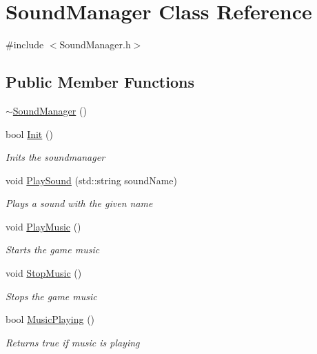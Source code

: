 \hypertarget{class_sound_manager}{}\section{Sound\+Manager Class Reference}
\label{class_sound_manager}


{\ttfamily \#include $<$Sound\+Manager.\+h$>$}

\subsection*{Public Member Functions}
\begin{DoxyCompactItemize}
\item 
\mbox{\hyperlink{class_sound_manager_ad5dbf8eab22db48ff8f3db51b02f8938}{$\sim$\+Sound\+Manager}} ()
\item 
bool \mbox{\hyperlink{class_sound_manager_af1ee5e29fca894a8ac9aeeb56b81f21d}{Init}} ()
\begin{DoxyCompactList}\small\item\em Inits the soundmanager \end{DoxyCompactList}\item 
void \mbox{\hyperlink{class_sound_manager_af84f2acbde4d8c0d8f5b47c2d917e486}{Play\+Sound}} (std\+::string sound\+Name)
\begin{DoxyCompactList}\small\item\em Plays a sound with the given name \end{DoxyCompactList}\item 
void \mbox{\hyperlink{class_sound_manager_ab4f6bc3b9c203232424b10da9912cf1b}{Play\+Music}} ()
\begin{DoxyCompactList}\small\item\em Starts the game music \end{DoxyCompactList}\item 
void \mbox{\hyperlink{class_sound_manager_a8b26fc4974bebd09b4bd7e108e8394ae}{Stop\+Music}} ()
\begin{DoxyCompactList}\small\item\em Stops the game music \end{DoxyCompactList}\item 
bool \mbox{\hyperlink{class_sound_manager_ae41fb3a3efb5b1fc9b39bd2764a032cc}{Music\+Playing}} ()
\begin{DoxyCompactList}\small\item\em Returns true if music is playing \end{DoxyCompactList}\end{DoxyCompactItemize}
